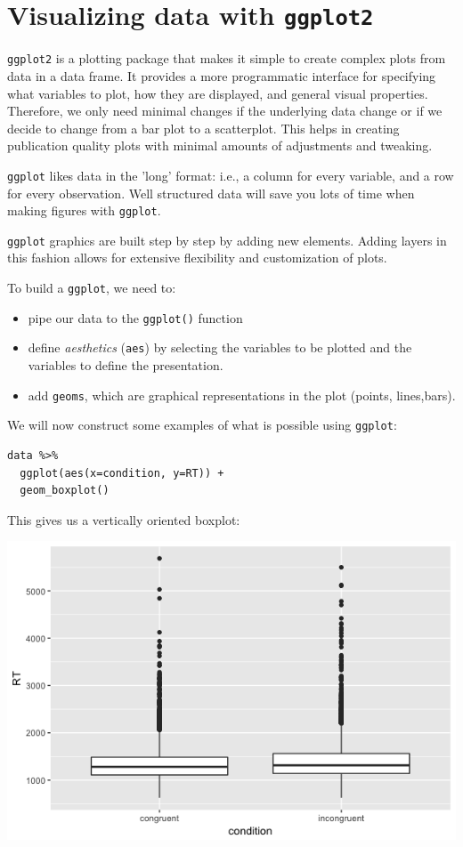 \documentclass[11pt]{article}
\begin{document}
\section*{Visualizing data with \texttt{ggplot2}}
\label{sec-4}

\texttt{ggplot2} is a plotting package that makes it simple to create complex plots from data in a data frame. It provides a more programmatic interface for specifying what variables to plot, how they are displayed, and general visual properties. Therefore, we only need minimal changes if the underlying data change
or if we decide to change from a bar plot to a scatterplot. This helps in creating publication quality plots with minimal amounts of adjustments and tweaking.

\texttt{ggplot} likes data in the 'long' format: i.e., a column for every variable, and a row for every observation. Well structured data will save you lots of time when making figures with \texttt{ggplot}.

\texttt{ggplot} graphics are built step by step by adding new elements. Adding layers in this fashion allows for extensive flexibility and customization of plots.

To build a \texttt{ggplot}, we need to:

\begin{itemize}
\item pipe our data to the \texttt{ggplot()} function
\item define \emph{aesthetics} (\texttt{aes}) by selecting the variables to be plotted and the variables to define the presentation.
\item add \texttt{geoms}, which are graphical representations in the plot (points, lines,bars).
\end{itemize}

We will now construct some examples of what is possible using \texttt{ggplot}:

\begin{verbatim}
data %>%
  ggplot(aes(x=condition, y=RT)) +
  geom_boxplot()
\end{verbatim}

This gives us a vertically oriented boxplot:

\includegraphics[width=.9\linewidth]{figures/week5/boxplot.png}
\end{document}
